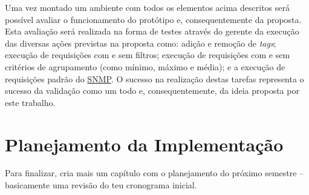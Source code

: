 \documentclass[twoside,english,brazilian]{UNISINOSmonografia}
\begin{document}
Uma vez montado um ambiente com todos os elementos acima descritos será 
possível avaliar o funcionamento do protótipo e, consequentemente da proposta.
Esta avaliação será realizada na forma de testes através do gerente da 
execução das diversas ações previstas na proposta como:
adição e remoção de \textit{tags};
execução de requisições com e sem filtros;
execução de requisições com e sem critérios de agrupamento (como mínimo, 
máximo e média);
e a execução de requisições padrão do \hyperref[siglas]{SNMP}.
O sucesso na realização destas tarefas representa o sucesso da validação como 
um todo e, consequentemente, da ideia proposta por este trabalho.


\chapter{Planejamento da Implementação}
Para finalizar, cria mais um capítulo com o planejamento do próximo semestre 
-- basicamente uma revisão do teu cronograma inicial.

%
%
%




  
\end{document}
